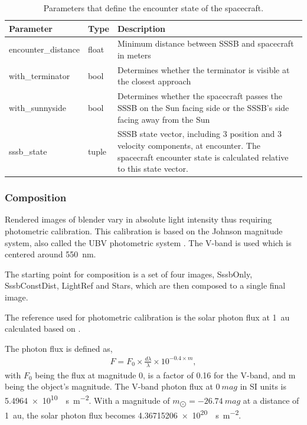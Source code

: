 \begin{table}[htb]
    \caption{Parameters that define the encounter state of the spacecraft.}
    \label{tab:sc_enc_paras}
    \begin{tabular}{p{}|p{}|p{}}
        Parameter           & Type  & Description                                                                                                                                                  \\ \hline
        encounter\_distance & float & Minimum distance between SSSB and spacecraft in meters                                                                                                       \\
        with\_terminator    & bool  & Determines whether the terminator is visible at the closest approach                                                                                         \\
        with\_sunnyside     & bool  & Determines whether the spacecraft passes the SSSB on the Sun facing side or the SSSB's side facing away from the Sun                                         \\
        sssb\_state         & tuple & SSSB state vector, including 3 position and 3 velocity components, at encounter. The spacecraft encounter state is calculated relative to this state vector.
    \end{tabular}
\end{table}

\subsubsection{Composition} \label{sec:composition}
Rendered images of blender vary in absolute light intensity thus requiring photometric calibration. This calibration is based on the Johnson magnitude system, also called the UBV photometric system \cite{bessel1979ubvri}. The V-band is used which is centered around \SI{550}{\nano\meter}.

The starting point for composition is a set of four images, SssbOnly, SssbConstDist, LightRef and Stars, which are then composed to a single final image.

The reference used for photometric calibration is the solar photon flux at \SI{1}{\astronomicalunit} calculated based on \cite{wirth}.

The photon flux is defined as,
\begin{align}
    F = F_0 \times \frac{d\lambda}{\lambda} \times 10^{-0.4 \times m}, \label{eq:comp_flux_0mag}
\end{align}
with $F_0$ being the flux at magnitude 0, is a factor of 0.16 for the V-band, and m being the object's magnitude. The V-band photon flux at $0~mag$ in SI units is \SI{5.4964e10}{\per\second \per\square\meter}. With a magnitude of $m_{\bigodot} = -26.74~mag$ at a distance of \SI{1}{\astronomicalunit}, the solar photon flux becomes \SI{4.36715206e+20}{\per\second\per\square\meter}.

